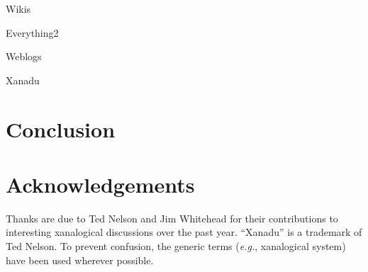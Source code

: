 \documentclass{acm_proc_article-sp}
\begin{document}
Wikis
\cite{WikiWikiWeb}
\cite{Wikipedia}

Everything2
\cite{Everything2}

Weblogs
\cite{kuro5hin}

Xanadu

\section{Conclusion}


\section{Acknowledgements}
Thanks are due to Ted Nelson and Jim Whitehead for their contributions to interesting xanalogical discussions over the past year. ``Xanadu'' is a trademark of Ted Nelson.  To prevent confusion, the generic terms ({\it e.g.}, xanalogical system) have been used wherever possible.



\end{document}

